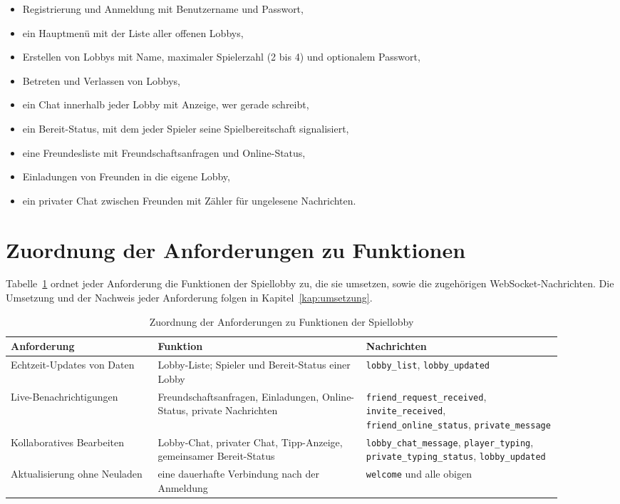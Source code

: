 \begin{itemize}
  \item Registrierung und Anmeldung mit Benutzername und Passwort,
  \item ein Hauptmenü mit der Liste aller offenen Lobbys,
  \item Erstellen von Lobbys mit Name, maximaler Spielerzahl (2 bis 4) und optionalem Passwort,
  \item Betreten und Verlassen von Lobbys,
  \item ein Chat innerhalb jeder Lobby mit Anzeige, wer gerade schreibt,
  \item ein Bereit-Status, mit dem jeder Spieler seine Spielbereitschaft signalisiert,
  \item eine Freundesliste mit Freundschaftsanfragen und Online-Status,
  \item Einladungen von Freunden in die eigene Lobby,
  \item ein privater Chat zwischen Freunden mit Zähler für ungelesene Nachrichten.
\end{itemize}

\section{Zuordnung der Anforderungen zu Funktionen}

Tabelle~\ref{tab:zuordnung} ordnet jeder Anforderung die Funktionen der Spiellobby zu, die sie umsetzen, sowie die zugehörigen WebSocket-Nachrichten. Die Umsetzung und der Nachweis jeder Anforderung folgen in Kapitel~\ref{kap:umsetzung}.

\begin{table}[ht]
  \centering
  \caption{Zuordnung der Anforderungen zu Funktionen der Spiellobby}
  \label{tab:zuordnung}
  \sffamily\small
  \begin{tabular}{p{0.24\linewidth}p{0.34\linewidth}p{0.32\linewidth}}
    \toprule
    \textbf{Anforderung} & \textbf{Funktion} & \textbf{Nachrichten} \\
    \midrule
    Echtzeit-Updates von Daten & Lobby-Liste; Spieler und Bereit-Status einer Lobby & \texttt{lobby\_list}, \texttt{lobby\_updated} \\
    \addlinespace
    Live-Benachrichtigungen & Freundschaftsanfragen, Einladungen, Online-Status, private Nachrichten & \texttt{friend\_request\_received}, \texttt{invite\_received}, \texttt{friend\_online\_status}, \texttt{private\_message} \\
    \addlinespace
    Kollaboratives Bearbeiten & Lobby-Chat, privater Chat, Tipp-Anzeige, gemeinsamer Bereit-Status & \texttt{lobby\_chat\_message}, \texttt{player\_typing}, \texttt{private\_typing\_status}, \texttt{lobby\_updated} \\
    \addlinespace
    Aktualisierung ohne Neuladen & eine dauerhafte Verbindung nach der Anmeldung & \texttt{welcome} und alle obigen \\
    \bottomrule
  \end{tabular}
\end{table}
